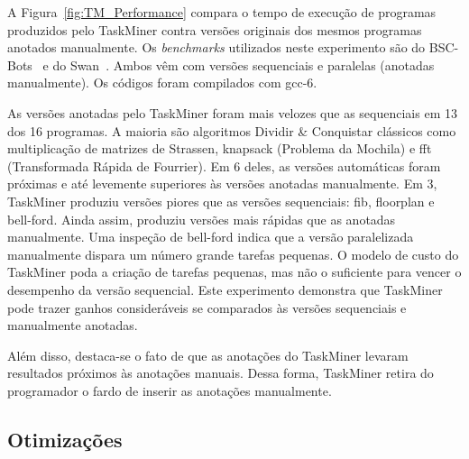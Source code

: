\documentclass[sigconf]{acmart}
\newcommand\Taskminer{\mbox{\textsf{TaskMiner}}}
\begin{document}
A Figura~\ref{fig:TM_Performance} compara o tempo de execução de programas produzidos
pelo {\Taskminer} contra versões originais dos mesmos programas anotados manualmente.
Os {\em benchmarks} utilizados neste experimento são do \textsf{BSC-Bots}~\cite{Duran09} 
e do \textsf{Swan}~\cite{Moreira17}.
Ambos vêm com versões sequenciais e paralelas (anotadas manualmente). Os códigos foram compilados
com gcc-6.

As versões anotadas pelo \Taskminer{} foram mais velozes que as sequenciais em 13 dos 16 programas.
A maioria são algoritmos Dividir \& Conquistar clássicos como multiplicação de matrizes de \textsf{Strassen},
 \textsf{knapsack} (Problema da Mochila) e \textsf{fft} (Transformada Rápida de Fourrier). Em 6 deles, as versões automáticas foram próximas e até
levemente superiores às versões anotadas manualmente. Em 3, \Taskminer{} produziu versões piores que
as versões sequenciais: \textsf{fib}, \textsf{floorplan} e \textsf{bell-ford}. Ainda assim, produziu versões
mais rápidas que as anotadas manualmente. Uma inspeção de \textsf{bell-ford} indica que a versão
paralelizada manualmente dispara um número grande tarefas pequenas. O modelo de custo
do \Taskminer{} poda a criação de tarefas pequenas, mas não o suficiente para vencer o desempenho
da versão sequencial. Este experimento demonstra que \Taskminer{} pode trazer
ganhos consideráveis se comparados às versões sequenciais e manualmente anotadas.

Além disso, destaca-se o fato de que as anotações do \Taskminer{} levaram resultados próximos às anotações manuais. Dessa forma, \Taskminer{} retira do programador o fardo de inserir as anotações manualmente.

\subsection{Otimizações}
\label{sub:optimizations}
\end{document}
